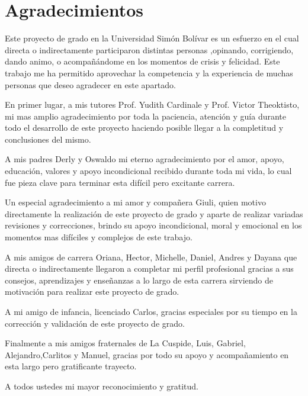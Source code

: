 \chapter{Agradecimientos}


Este proyecto de grado en la Universidad Simón Bolívar es un esfuerzo en el cual directa o indirectamente participaron distintas personas ,opinando, corrigiendo, dando animo, o acompañándome en los momentos de crisis y felicidad.
Este trabajo me ha permitido aprovechar la  competencia y la experiencia de muchas personas que deseo agradecer en este apartado.

En primer lugar, a mis tutores Prof. Yudith Cardinale y Prof. Victor Theoktisto, mi mas amplio agradecimiento por toda la paciencia, atención y guía durante todo el desarrollo de este proyecto haciendo posible llegar a la completitud y conclusiones del mismo.

A mis padres Derly y Oswaldo mi eterno agradecimiento por el amor, apoyo, educación, valores y apoyo incondicional recibido durante toda mi vida, lo cual fue pieza clave para terminar esta difícil pero excitante carrera.

Un especial agradecimiento a mi amor y compañera Giuli, quien motivo directamente la realización de este proyecto de grado y aparte de realizar variadas revisiones y correcciones, brindo su apoyo incondicional, moral y emocional en los momentos mas difíciles y complejos de este trabajo. 

A mis amigos de carrera Oriana, Hector, Michelle, Daniel, Andres y Dayana  que directa o indirectamente llegaron a completar mi perfil profesional gracias a sus consejos, aprendizajes y enseñanzas a lo largo de esta carrera sirviendo de  motivación para realizar este proyecto de grado.

A mi amigo de infancia, licenciado Carlos, gracias especiales por su tiempo en la corrección y validación de este proyecto de grado.

Finalmente a mis amigos fraternales de La Cuspide, Luis, Gabriel, Alejandro,Carlitos y Manuel, gracias por todo su apoyo y acompañamiento en esta largo pero gratificante trayecto.

A todos ustedes mi mayor reconocimiento y gratitud.

